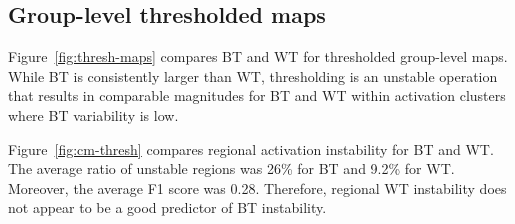 \documentclass[conference]{IEEEtran}
\begin{document}
  \subsection{Group-level thresholded maps}

  Figure~\ref{fig:thresh-maps} compares BT and WT for thresholded group-level maps.
  While BT is consistently larger than WT, thresholding is an unstable operation 
  that results in comparable magnitudes for BT and WT within activation clusters where BT variability is low. 

  Figure~\ref{fig:cm-thresh} compares regional activation instability for BT and WT. The average ratio
  of unstable regions was 26\% for BT and 9.2\% for WT. Moreover, the average F1 score was 0.28. Therefore, regional 
  WT instability does not appear to be a 
  good predictor of BT instability.
  
  
  \begin{figure}[ht]
    \end{figure}
  
    \begin{figure}[ht]
    \end{figure}
\end{document}
